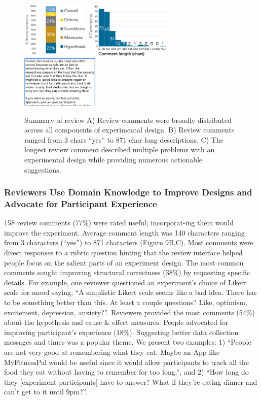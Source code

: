 \begin{figure}[h] 
  \includegraphics[width=0.66\textwidth]{figures/galileo/galileo-study2-2}
  \includegraphics[width=0.33\textwidth]{figures/galileo/galileo-study2-3}
  \caption[Result: Review comments were distributed across all components of experimental design]
{Summary of review A) Review comments were broadly distributed across all components of experimental design. B) Review comments ranged from 3 chars “yes” to 871 char long descriptions. C) The longest review comment described multiple problems with an experimental design while providing numerous actionable suggestions. }
  \label{fig:galileo-result2-2}
\end{figure}

\subsubsection{Reviewers Use Domain Knowledge to Improve Designs and Advocate for Participant Experience}
158 review comments (77\%) were rated useful; incorporat-ing them would improve the experiment. Average comment length was 140 characters ranging from 3 characters (“yes”) to 871 characters (Figure 9B,C). Most comments were direct responses to a rubric question hinting that the review interface helped people focus on the salient parts of an experiment design.
The most common comments sought improving structural correctness (38\%) by requesting specific details. For example, one reviewer questioned an experiment’s choice of Likert scale for mood saying, “A simplistic Likert scale seems like a bad idea. There has to be something better than this. At least a couple questions? Like, optimism, excitement, depression, anxiety?”. Reviewers provided the most comments (54\%) about the hypothesis and cause \& effect measures. People advocated for improving participant’s experience (18\%). Suggesting better data collection messages and times was a popular theme. We present two examples: 1) “People are not very good at remembering what they eat. Maybe an App like MyFitnessPal would be useful since it would allow participants to track all the food they eat without having to remember for too long.”, and 2) “How long do they [experiment participants] have to answer? What if they're eating dinner and can't get to it until 9pm?”.

